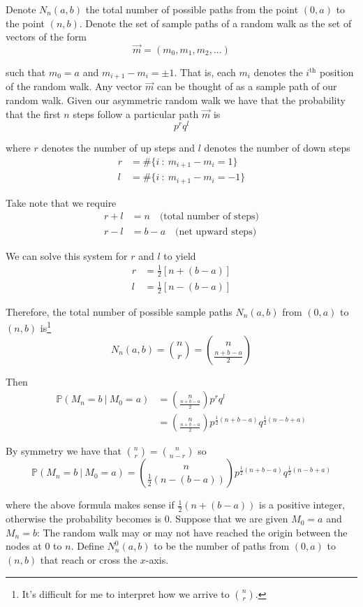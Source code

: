 \documentclass[12pt]{article}
\newlength\tindent
\renewcommand{\indent}{\hspace*{\tindent}}
\renewcommand{\P}{\mathbb P}
\begin{document}
\indent Denote $N_n(a,b)$ the total number of possible paths from the point $(0,a)$ to the point $(n,b)$. Denote the set of sample paths of a random walk as the set of vectors of the form
\begin{equation*}
	\vec{m} = (m_0, m_1, m_2, ...)
\end{equation*}

such that $m_0 = a$ and $m_{i + 1} - m_i = \pm 1$. That is, each $m_i$ denotes the  $i^\text{th}$ position of the random walk. Any vector $\vec{m}$ can be thought of as a sample path of our random walk. Given our asymmetric random walk we have that the probability that the first $n$ steps follow a particular path $\vec{m}$ is 
\begin{equation*}
	p^rq^l
\end{equation*}

where $r$ denotes the number of up steps and $l$ denotes the number of down steps
\begin{align*}
	r &= \# \{ i~:~m_{i + 1} - m_i = 1 \} \\
	l &= \# \{ i~:~m_{i + 1} - m_i = -1  \}
\end{align*}

Take note that we require
\begin{align*}
	r + l &= n \quad \text{(total number of steps)} \\
	r - l &= b - a \quad \text{(net upward steps)}
\end{align*}

We can solve this system for $r$ and $l$ to yield
\begin{align*}
	r &= \frac{1}{2}[n + (b - a)] \\
	l &= \frac{1}{2}[n - (b - a)]
\end{align*}

Therefore, the total number of possible sample paths $N_n(a,b)$ from $(0,a)$ to $(n,b)$ is\footnote{It's difficult for me to interpret how we arrive to ${{n}\choose{r}}$.}
\begin{equation*}
	N_n(a,b) = {{n}\choose{r}} = {{n}\choose{\frac{n + b - a}{2}}}
\end{equation*}

Then
\begin{align*}
	\P(M_n = b~|~M_0 = a) &= {{n}\choose{\frac{n + b - a}{2}}} p^r q^l \\
	&= {{n}\choose{\frac{n + b - a}{2}}} p^{\frac{1}{2}(n + b - a)} q^{\frac{1}{2}(n - b + a)}
\end{align*}

By symmetry we have that ${{n}\choose{r}} = {{n}\choose{n - r}}$ so
\begin{equation*}
	\P(M_n = b~|~M_0 = a) = {{n}\choose{ \frac{1}{2}(n - (b - a)) }} p^{\frac{1}{2}(n + b - a)} q^{\frac{1}{2}(n - b + a)}
\end{equation*}

where the above formula makes sense if $\frac{1}{2}(n + (b - a))$ is a positive integer, otherwise the probability becomes is 0. Suppose that we are given $M_0 = a$ and $M_n = b$: The random walk may or may not have reached the origin between the nodes at 0 to $n$. Define $N^0_n(a,b)$ to be the number of paths from $(0,a)$ to $(n,b)$ that reach or cross the $x$-axis. \\
\end{document}
